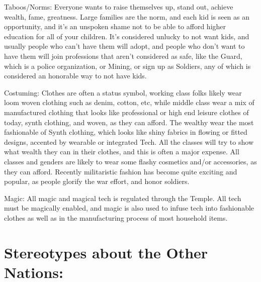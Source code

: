 \documentclass[blue]{GL2020}
\begin{document}
Taboos/Norms:	Everyone wants to raise themselves up, stand out, achieve wealth, fame, greatness.  Large families are the norm, and each kid is seen as an opportunity, and it's an unspoken shame not to be able to afford higher education for all of your children.  It's considered unlucky to not want kids, and usually people who can't have them will adopt, and people who don't want to have them will join professions that aren't considered as safe, like the Guard, which is a police organization, or Mining, or sign up as Soldiers, any of which is considered an honorable way to not have kids.


Costuming:		Clothes are often a status symbol, working class folks likely wear loom woven clothing such as denim, cotton, etc, while middle class wear a mix of manufactured clothing that looks like professional or high end leisure clothes of today, synth clothing, and woven, as they can afford.  The wealthy wear the most fashionable of Synth clothing, which looks like shiny fabrics in flowing or fitted designs, accented by wearable or integrated Tech.  All the classes will try to show what wealth they can in their clothes, and this is often a major expense.  All classes and genders are likely to wear some flashy cosmetics and/or accessories, as they can afford.  Recently militaristic fashion has become quite exciting and popular, as people glorify the war effort, and honor soldiers.


Magic:			All magic and magical tech is regulated through the Temple.  All tech must be magically enabled, and magic is also used to infuse tech into fashionable clothes as well as in the manufacturing process of most household items.
									

\section*{Stereotypes about the Other Nations:}
\end{document}
